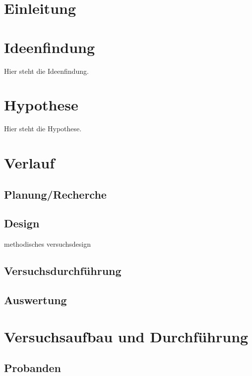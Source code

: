 \documentclass{Bericht}
\begin{document}
\maketitle


\tableofcontents
\clearpage

\section{Einleitung}

\section{Ideenfindung}
	Hier steht die Ideenfindung.

\section{Hypothese}
		Hier steht die Hypothese.

\section{Verlauf}
	\subsection{Planung/Recherche} %
	\subsection{Design} %
		methodisches versuchsdesign
	\subsection{Versuchsdurchführung} %
	\subsection{Auswertung} %

\section{Versuchsaufbau und Durchführung}
	\subsection{Probanden}
\end{document}

